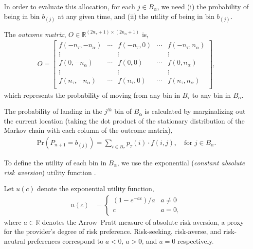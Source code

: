 \documentclass[sigconf, usenames, dvipsnames]{acmart}
\begin{document}
In order to evaluate this allocation, for each $j \in B_{\alpha}$, we need (i) the probability of being in  bin $b_{(j)}$ at any given time, and (ii) the utility of being in  bin $b_{(j)}$.
%
\begin{definition}
The \textit{outcome matrix}, $O \in \mathbb{R}^{(2n_{\tau}+1)\times (2n_{\alpha}+1)}$ is,
\begin{align}
O = 
\begin{bmatrix}
  f(-n_{\tau},-n_{\alpha}) & \cdots & f(-n_{\tau}, 0) & \cdots & f(-n_{\tau},n_{\alpha}) \\
  \vdots & & \vdots &  & \vdots \\
  f(0,-n_{\alpha}) & \cdots & f(0, 0) & \cdots & f(0,n_{\alpha}) \\
  \vdots & & \vdots &  & \vdots \\
  f(n_{\tau},-n_{\alpha}) & \cdots & f(n_{\tau}, 0) & \cdots & f(n_{\tau},n_{\alpha}) \\
\end{bmatrix},
\end{align}
which represents the probability of moving from any bin in $B_{\tau}$ to any bin in $B_{\alpha}$.
\end{definition}
The probability of landing in the $j^{th}$ bin of $B_{\alpha}$ 
is calculated by marginalizing out the current location (taking the dot product of the stationary distribution of the Markov chain with each column of the outcome matrix),
%
\begin{align}
    \mathrm{Pr}\left(P_{n+1} = b_{(j)}\right) = \sum_{i \in B_{\tau}} p_{\tau}(i) \cdot f(i,j), \quad \text{for } j \in B_{\alpha}.
\end{align}

To define the utility of each bin in $B_{\alpha}$, we use the  exponential (\textit{constant absolute risk aversion}) utility function \cite{arrow1965aspects, pratt1978risk}.
%
\begin{definition}\label{def:exponential_utility}
Let $u(c)$ denote the exponential utility function,
\begin{align}\label{eq:exponential_utility}
    u(c) &= 
    \begin{cases}
    \left(1-e^{-ac}\right) / a & a\neq 0 \\
    c & a = 0,
    \end{cases}
\end{align}
where $a \in \mathbb{R}$ denotes the Arrow--Pratt measure of absolute risk aversion, a proxy for the provider's degree of risk preference.
Risk-seeking, risk-averse, and risk-neutral preferences correspond to $a < 0$, $a > 0$, and $a = 0$ respectively.
\end{definition}
\end{document}
